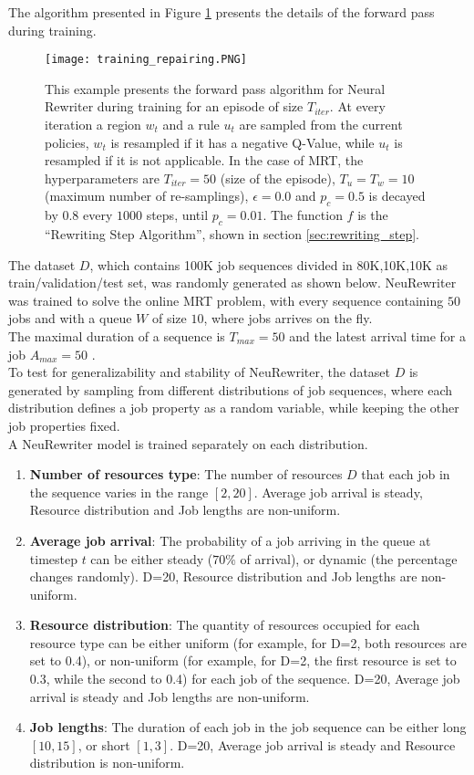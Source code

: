 \documentclass[12pt]{article}
\begin{document}
\medbreak
The algorithm presented in Figure \ref{img:training_repairing} presents the details of the forward pass during training. 
\begin{figure}[H]
    \centering
    \texttt{[image: training\_repairing.PNG]}
    \caption{This example presents the forward pass algorithm for Neural Rewriter during training for an episode of size $T_{iter}$\cite{neu_rewriter}. At every iteration a region $w_t$ and a rule $u_t$ are sampled from the current policies, $w_t$ is resampled if it has a negative Q-Value, while $u_t$ is resampled if it is not applicable. In the case of MRT, the hyperparameters are $T_{iter}=50$ (size of the episode), $T_u=T_w=10$ (maximum number of re-samplings), $\epsilon=0.0$ and $p_c=0.5$ is decayed by $0.8$ every $1000$ steps, until $p_c=0.01$. The function $f$ is the ``Rewriting Step Algorithm'', shown in section \ref{sec:rewriting_step}.}
    \label{img:training_repairing}
\end{figure}
The dataset $D$, which contains 100K job sequences divided in 80K,10K,10K as train/validation/test set, was randomly generated as shown below. NeuRewriter was trained to solve the online MRT problem, with every sequence containing $50$ jobs and with a queue $W$ of size $10$, where jobs arrives on the fly.\\
The maximal duration of a sequence is $T_{max}=50$ and the latest arrival time for a job $A_{max} = 50$ \cite{neu_rewriter}.\\

\medbreak
To test for generalizability and stability of NeuRewriter, the dataset $D$ is generated by sampling from different distributions of job sequences, where each distribution defines a job property as a random variable, while keeping the other job properties fixed.\\
A NeuRewriter model is trained separately on each distribution.
\begin{enumerate}
    \item \textbf{Number of resources type}: The number of resources $D$ that each job in the sequence varies in the range $[2,20]$. Average job arrival is steady, Resource distribution and Job lengths are non-uniform.
    \item \textbf{Average job arrival}: The probability of a job arriving in the queue at timestep $t$ can be either steady ($70\%$ of arrival), or dynamic (the percentage changes randomly). D=20, Resource distribution and Job lengths are non-uniform.
    \item \textbf{Resource distribution}: The quantity of resources occupied for each resource type can be either uniform (for example, for D=2, both resources are set to 0.4), or non-uniform (for example, for D=2, the first resource is set to 0.3, while the second to 0.4) for each job of the sequence. D=20, Average job arrival is steady and Job lengths are non-uniform.
    \item \textbf{Job lengths}: The duration of each job in the job sequence can be either long $[10,15]$, or short $[1,3]$. D=20, Average job arrival is steady and Resource distribution is non-uniform.
\end{enumerate}
\end{document}
